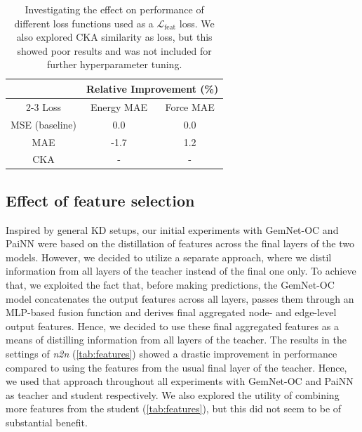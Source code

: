 \documentclass{article}
\newcommand{\loss}{\mathcal{L}}
\begin{document}
\begin{table}[h]
\centering
\caption{\label{tab:mae} Investigating the effect on performance of different loss functions used as a $\loss_\text{feat}$ loss. We also explored CKA similarity as loss, but this showed poor results and was not included for further hyperparameter tuning. }
\begin{tabular}{ccc}
               & \multicolumn{2}{c}{Relative Improvement (\%)} \\ \cline{2-3} 
Loss           & Energy MAE            & Force MAE            \\ \hline
MSE (baseline) & 0.0                   & 0.0                  \\
MAE            & -1.7                  & 1.2                  \\
CKA            & -                     & -                   
\end{tabular}
\end{table}

\subsection{Effect of feature selection}
\label{ap:features}
Inspired by general KD setups, our initial experiments with GemNet-OC and PaiNN were based on the distillation of features across the final layers of the two models. However, we decided to utilize a separate approach, where we distil information from all layers of the teacher instead of the final one only. To achieve that, we exploited the fact that, before making predictions, the GemNet-OC model concatenates the output features across all layers, passes them through an MLP-based fusion function and derives final aggregated node- and edge-level output features. Hence, we decided to use these final aggregated features as a means of distilling information from all layers of the teacher. The results in the settings of \emph{n2n} (\cref{tab:features}) showed a drastic improvement in performance compared to using the features from the usual final layer of the teacher. Hence, we used that approach throughout all experiments with GemNet-OC and PaiNN as teacher and student respectively. We also explored the utility of combining more features from the student (\cref{tab:features}), but this did not seem to be of substantial benefit.
\end{document}
